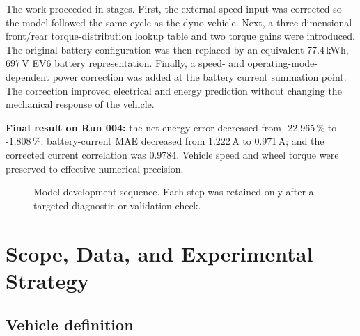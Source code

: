 \documentclass[11pt,letterpaper]{article}
\newcommand{\SI}[2]{#1\,#2}
\newcommand{\percent}{\%}
\begin{document}
The work proceeded in stages. First, the external speed input was corrected so
the model followed the same cycle as the dyno vehicle. Next, a three-dimensional
front/rear torque-distribution lookup table and two torque gains were introduced.
The original battery configuration was then replaced by an equivalent
\SI{77.4}{kWh}, \SI{697}{V} EV6 battery representation. Finally, a
speed- and operating-mode-dependent power correction was added at the battery
current summation point. The correction improved electrical and energy
prediction without changing the mechanical response of the vehicle.

\begin{keybox}
\textbf{Final result on Run 004:} the net-energy error decreased from
\SI{-22.965}{\percent} to \SI{-1.808}{\percent}; battery-current MAE decreased
from \SI{1.222}{A} to \SI{0.971}{A}; and the corrected current correlation was
0.9784. Vehicle speed and wheel torque were preserved to effective numerical
precision.
\end{keybox}

\begin{figure}[!htbp]
\centering
{}
\caption{Model-development sequence. Each step was retained only after a targeted diagnostic or validation check.}
\end{figure}

\section{Scope, Data, and Experimental Strategy}

\subsection{Vehicle definition}
\end{document}
